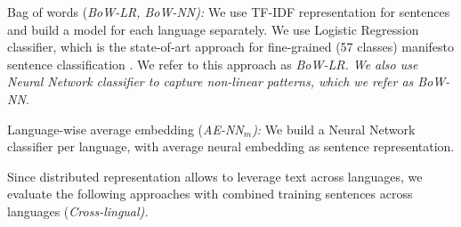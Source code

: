 \documentclass[11pt,a4paper]{article}
\begin{document}
\begin{description}
\item{Bag of words (\em{BoW-LR}, \em{BoW-NN}):} We use TF-IDF representation for sentences and build a model for each language separately. We use Logistic Regression classifier, which is the state-of-art approach for fine-grained (57 classes) manifesto sentence classification \cite{biessmann2016automating}. We refer to this approach as \em{BoW-LR}. \rm We also use Neural Network classifier to capture non-linear patterns, which we refer as \em{BoW-NN}.

\item{Language-wise average embedding (\em{AE-NN$_{m}$}):} \rm We build a Neural Network classifier per language, with average neural embedding as sentence representation.
\end{description}



Since distributed representation allows to leverage text across languages, we evaluate the following approaches with combined training sentences across languages (\em{Cross-lingual}). \rm
\end{document}
